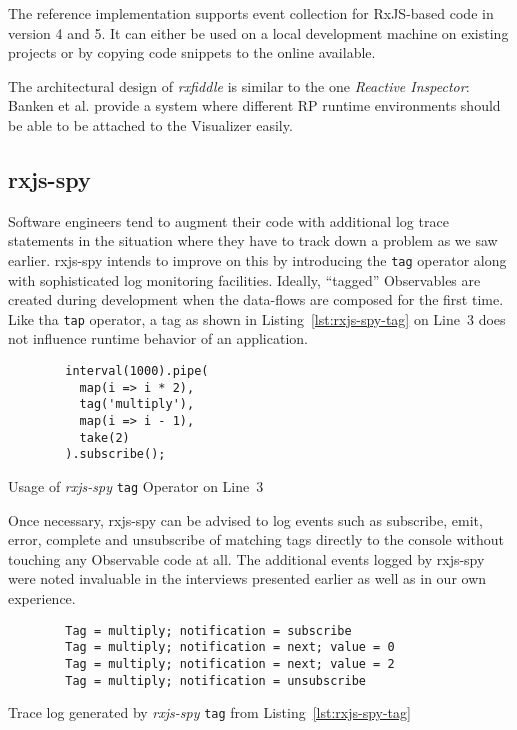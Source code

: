 \documentclass[12pt,a4paper]{article}
\begin{document}
The reference implementation supports event collection for RxJS-based code in version 4 and 5. It can either be used on a local development machine on existing projects or by copying code snippets to the online available.

The architectural design of \emph{rxfiddle} is similar to the one \emph{Reactive Inspector}: Banken et al. provide a system where different RP runtime environments should be able to be attached to the Visualizer easily.

\subsection{rxjs-spy}

Software engineers tend to augment their code with additional log trace statements in the situation where they have to track down a problem as we saw earlier. rxjs-spy\cite{rxjsspy} intends to improve on this by introducing the \texttt{tag} operator along with sophisticated log monitoring facilities. Ideally, ``tagged'' Observables are created during development when the data-flows are composed for the first time. Like tha \texttt{tap} operator, a tag as shown in Listing~\ref{lst:rxjs-spy-tag} on Line~3 does not influence runtime behavior of an application.

\begin{listing}[H]
	\begin{verbatim}
		interval(1000).pipe(
		  map(i => i * 2),
		  tag('multiply'),
		  map(i => i - 1),
		  take(2)
		).subscribe();
	\end{verbatim}
	\caption{Usage of \emph{rxjs-spy} \texttt{tag} Operator on Line~3}
	\label{lst:rxjs-spy-tag}
\end{listing}

Once necessary, rxjs-spy can be advised to log events such as subscribe, emit, error, complete and unsubscribe of matching tags directly to the console without touching any Observable code at all. The additional events logged by rxjs-spy were noted invaluable in the interviews presented earlier as well as in our own experience.

\begin{listing}[H]
	\begin{verbatim}
		Tag = multiply; notification = subscribe
		Tag = multiply; notification = next; value = 0
		Tag = multiply; notification = next; value = 2
		Tag = multiply; notification = unsubscribe
	\end{verbatim}
	\caption{Trace log generated by \emph{rxjs-spy} \texttt{tag} from Listing~\ref{lst:rxjs-spy-tag}}
	\label{lst:rxjs-spy-log}
\end{listing}
\end{document}
